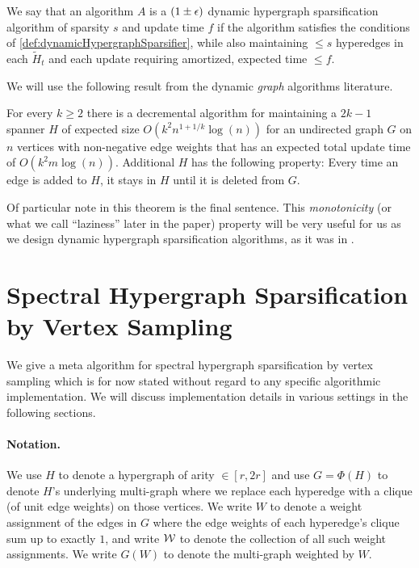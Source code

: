\documentclass{article}
\begin{document}
\begin{definition}
    We say that an algorithm $A$ is a $(1 \pm \epsilon)$ dynamic hypergraph sparsification algorithm of sparsity $s$ and update time $f$ if the algorithm satisfies the conditions of \cref{def:dynamicHypergraphSparsifier}, while also maintaining $\leq s$ hyperedges in each $\widetilde{H}_t$ and each update requiring amortized, expected time $\leq f$.
\end{definition}

We will use the following result from the dynamic \emph{graph} algorithms literature. 

\begin{theorem}\cite{ADKKP16}
For every $k \geq 2$ there is a decremental algorithm for maintaining a $2k-1$ spanner $H$ of expected size $O(k^2 n^{1 + 1 / k} \log(n))$ for an undirected graph $G$ on $n$ vertices with non-negative edge weights that has an expected total update time of $O(k^2 m \log(n))$. Additional $H$ has the following
property: Every time an edge is added to $H$, it stays in $H$ until it is deleted from $G$. 
\end{theorem}

\begin{remark}
Of particular note in this theorem is the final sentence. This \emph{monotonicity} (or what we call ``laziness'' later in the paper) property will be very useful for us as we design dynamic hypergraph sparsification algorithms, as it was in \cite{ADKKP16}.
\end{remark}

\section{Spectral Hypergraph Sparsification by Vertex Sampling}\label{sec:vsvsvs}

We give a meta algorithm for spectral hypergraph sparsification by vertex sampling which is for now stated without regard to any specific algorithmic implementation. We will discuss implementation details in various settings in the following sections.

\paragraph{Notation.}{We use $H$ to denote a hypergraph of arity $\in [r,2r]$ and
use $G = \Phi(H)$ to denote $H$'s underlying multi-graph where
we replace each hyperedge with a clique (of unit edge weights) on those vertices.
We write $W$ to denote a weight assignment
of the edges in $G$ where the edge weights of each hyperedge's clique sum up to exactly $1$,
and write $\mathcal{W}$ to denote the collection of all such weight assignments.
We write $G(W)$ to denote the multi-graph weighted by $W$.}
\end{document}
